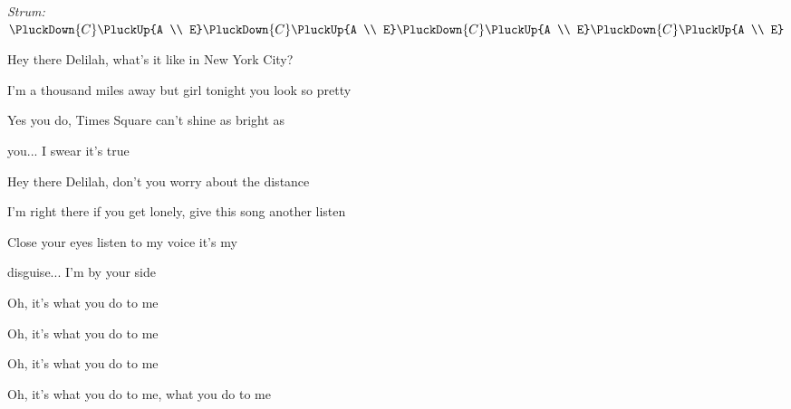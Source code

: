 \begin{song}


\begin{strumbox}
\textit{Strum:} $\PluckDown{C}\PluckUp{A \\ E}\PluckDown{C}\PluckUp{A \\ E}\PluckDown{C}\PluckUp{A \\ E}\PluckDown{C}\PluckUp{A \\ E}$
\end{strumbox}

\begin{vchordbox}
\vspace{2em}
\par
{}\par
{}\par
{}\par
{}\par
\end{vchordbox}

\bigskip

\Intro {}    \par

\bigskip

 Hey there Delilah, what's it like in New York City? \par
I'm a thousand miles away but girl tonight you look so pretty \par
Yes you do,  Times Square can't shine as bright as \par
{}you... I swear it's true \par

\bigskip

 Hey there Delilah, don't you worry about the distance \par
I'm right there if you get lonely, give this song another listen \par
Close your eyes listen to my voice it's my \par
disguise... I'm by your side \par

\bigskip

\begin{chorusbox}{\Chorus}
Oh, it's what you do to me \par
{}Oh, it's what you do to me \par
{}Oh, it's what you do to me \par
{}Oh, it's what you do to me, what you  do to me \par
\end{chorusbox}


\end{song}
